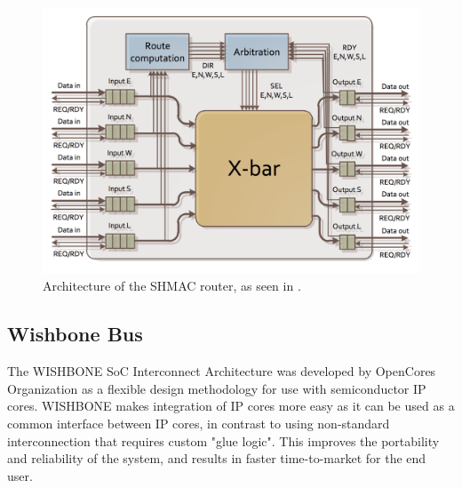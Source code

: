 \begin{figure}[htb]
    \centering
    \includegraphics[width=1.0\textwidth]{Figures/Heterogeneous/SHMACRouter}
    \caption{Architecture of the SHMAC router, as seen in \cite{shmac-plan}.}
    \label{fig:shmac-router}
\end{figure}




%

\subsection{Wishbone Bus}
The WISHBONE SoC Interconnect Architecture was developed by OpenCores Organization as a flexible design methodology for use with semiconductor IP cores.
WISHBONE makes integration of IP cores more easy as it can be used as a common interface between IP cores, in contrast to using non-standard interconnection that requires custom "glue logic". 
This improves the portability and reliability of the system, and results in faster time-to-market for the end user.

